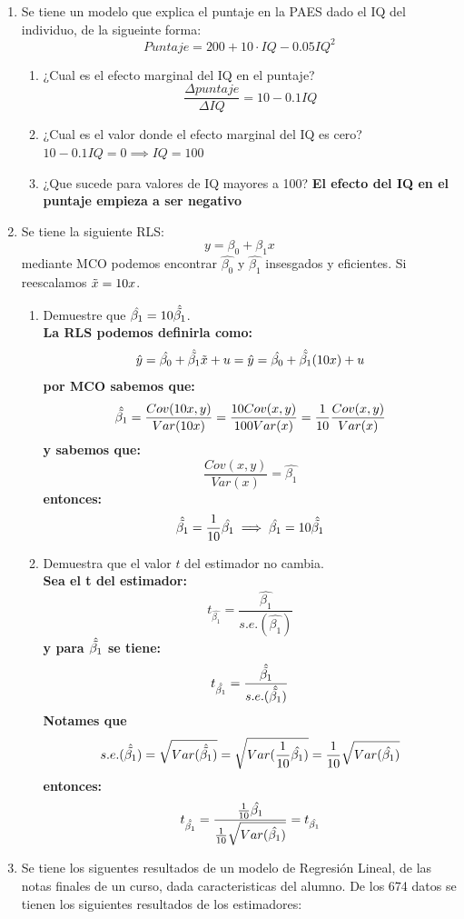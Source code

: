 \documentclass[10pt,a4paper]{article}
\begin{document}
\begin{enumerate}
\item Se tiene un modelo que explica el puntaje en la PAES dado el IQ del individuo, de la sigueinte forma:
$$Puntaje = 200 + 10 \cdot IQ -  0.05IQ^2$$
\begin{enumerate}
    \item ¿Cual es el efecto marginal del IQ en el puntaje?
    \textbf{$$\frac{\Delta puntaje}{\Delta IQ} = 10-0.1IQ$$ }
    \item ¿Cual es el valor donde el efecto marginal del IQ es cero?
    \textbf{$10-0.1IQ=0 \implies IQ = 100$}
    \item ¿Que sucede para valores de IQ mayores a 100?
    \textbf{El efecto del IQ en el puntaje empieza a ser negativo}
\end{enumerate}

\item Se tiene la siguiente RLS:
$$y = \beta_0 + \beta_1x$$
mediante MCO podemos encontrar $\hat{\beta_0}$ y $\hat{\beta_1}$ insesgados y eficientes. Si reescalamos $\Tilde{x} = 10x$. 
\begin{enumerate}
    \item Demuestre que $\hat{\beta_1}=10\hat{\Tilde{\beta_1}}$. \\
    \textbf{La RLS podemos definirla como:
    $$\hat{y} = \hat{\beta_0} + \hat{\Tilde{\beta_1}}\Tilde{x}+u = \hat{y} = \hat{\beta_0} + \hat{\Tilde{\beta_1}}(10x)+u$$
    por MCO sabemos que:
    $$\hat{\Tilde{\beta_1}}=\frac{Cov(10x,y)}{Var(10x)}=\frac{10Cov(x,y)}{100Var(x)}=\frac{1}{10}\frac{Cov(x,y)}{Var(x)}$$
    y sabemos que:
    $$\frac{Cov(x,y)}{Var(x)} = \hat{\beta_1}$$
    entonces:
    $$\hat{\Tilde{\beta_1}} = \frac{1}{10}\hat{\beta_1} \implies \hat{\beta_1} = 10\hat{\Tilde{\beta_1}}$$}
\item Demuestra que el valor $t$ del estimador no cambia. \\
\textbf{ Sea el t del estimador:
$$t_{\hat{\beta_1}} = \frac{\hat{\beta_1}}{s.e.(\hat{\beta_1})}$$
y para $\hat{\Tilde{\beta_1}}$ se tiene:
$$t_{\hat{\Tilde{\beta_1}}} = \frac{\hat{\Tilde{\beta_1}}}{s.e.(\hat{\Tilde{\beta_1}})}$$
Notames que 
$$s.e.(\hat{\Tilde{\beta_1}}) = \sqrt{Var(\hat{\Tilde{\beta_1}})}=\sqrt{Var(\frac{1}{10}\hat{{\beta_1}})}=\frac{1}{10}\sqrt{Var(\hat{{\beta_1}})}$$
entonces:
$$t_{\hat{\Tilde{\beta_1}}} = \frac{\frac{1}{10}\hat{{\beta_1}}}{\frac{1}{10}\sqrt{Var(\hat{{\beta_1}})}} = t_{\hat{\beta_1}}$$
}
    
\end{enumerate}

\item  Se tiene los siguentes resultados de un modelo de Regresión Lineal, de las notas finales de un curso, dada caracteristicas del alumno. De los 674 datos se tienen los siguientes resultados de los estimadores:


\end{enumerate}
\end{document}
